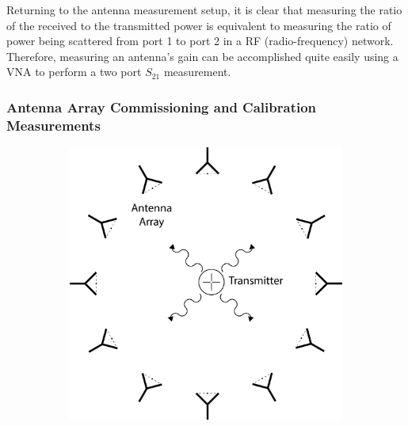 Returning to the antenna measurement setup, it is clear that measuring the ratio of the received to the transmitted power is equivalent to measuring the ratio of power being scattered from port 1 to port 2 in a RF (radio-frequency) network. Therefore, measuring an antenna's gain can be accomplished quite easily using a VNA to perform a two port $S_{21}$ measurement.

\subsubsection{Antenna Array Commissioning and Calibration Measurements}

\begin{figure}[htbp]
    \centering
    \begin{subfigure}[b]{0.4\textwidth}
        \centering
        \includegraphics[width=1\textwidth]{figs/Chapter-5/230409_beamform_array_meas.png}
        \caption{\label{fig:beam-array-meas}}
    \end{subfigure}
    \hfill
    \begin{subfigure}[b]{0.4\textwidth}
        \centering

\end{subfigure}
\end{figure}
